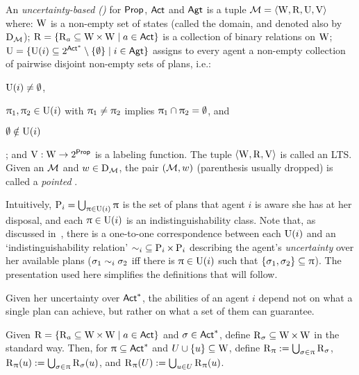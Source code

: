 \medskip

\begin{definition}\label{def:ults}
An \emph{uncertainty-based \lts (\ults)} for ${\rm \sf Prop}$, ${\rm \sf Act}$ and ${\rm \sf Agt}$ is a tuple $\mathcal{M} = \langle \operatorname{W},\operatorname{R},\operatorname{U},\operatorname{V} \rangle$ where: $\operatorname{W}$ is a non-empty set of states (called the domain, and
denoted also by $\operatorname{D}_{\mathcal{M}}$);
$\operatorname{R} = \{ \operatorname{R}_a \subseteq \operatorname{W} \times \operatorname{W} \mid a \in {\rm \sf Act} \}$ is a
collection of binary relations on $\operatorname{W}$;
$\operatorname{U} = \{ \operatorname{U}(i) \subseteq 2^{{\rm \sf Act}^*}\setminus \{ \emptyset \} \mid i \in {\rm \sf Agt} \}$ assigns to every agent a non-empty collection of pairwise disjoint non-empty sets of plans, i.e.: \begin{inlineenum} \item $\operatorname{U}(i) \neq \emptyset$, \item $\uppi_1, \uppi_2 \in \operatorname{U}(i)$ with $\uppi_1 \neq \uppi_2$ implies $\uppi_1 \cap \uppi_2 = \emptyset$, and \item $\emptyset \notin \operatorname{U}(i)$\end{inlineenum};
and $\operatorname{V}:\operatorname{W} \to 2^{\rm \sf Prop}$ is a labeling function. The tuple $\langle \operatorname{W},\operatorname{R},\operatorname{V} \rangle$ is called an LTS. 
Given an \ults $\mathcal{M}$ and $w \in \operatorname{D}_{\mathcal{M}}$, the pair $(\mathcal{M},w)$ (parenthesis usually dropped) is called a \emph{pointed \ults}.
\end{definition}
\medskip


Intuitively, $\operatorname{P}_{i} = \bigcup_{\uppi \in \operatorname{U}(i)} \uppi$ is the set of plans that agent $i$ is aware she has at her disposal, and each $\uppi \in \operatorname{U}(i)$ is an indistinguishability class. Note that, as discussed in~\cite{AFSVQ21}, there is a one-to-one correspondence between each $\operatorname{U}(i)$ and an `indistinguishability relation' ${\sim_i} \subseteq \operatorname{P}_{i} \times \operatorname{P}_{i}$ describing the agent's \emph{uncertainty} over her available plans ($\sigma_1 \sim_i \sigma_2$ iff there is $\uppi \in \operatorname{U}(i)$ such that $\{ \sigma_1, \sigma_2 \} \subseteq \uppi$). The presentation used here simplifies the definitions that will follow.

Given her uncertainty over ${\rm \sf Act}^*$, the abilities of an agent $i$ depend not on what a single plan can achieve, but rather on what a set of them can guarantee.

\medskip

\begin{definition}
Given $\operatorname{R}=\{ \operatorname{R}_a \subseteq \operatorname{W} \times \operatorname{W} \mid a\in{\rm \sf Act} \}$ and $\sigma \in {\rm \sf Act}^*$, define $\operatorname{R}_\sigma \subseteq \operatorname{W} \times \operatorname{W}$ in the standard way. Then, for $\uppi \subseteq {\rm \sf Act}^*$ and $U \cup \{u \} \subseteq \operatorname{W}$, define $\operatorname{R}_\uppi := \bigcup_{\sigma \in \uppi} \operatorname{R}_{\sigma}$, $\operatorname{R}_{\uppi}(u) := \bigcup_{\sigma \in \uppi} \operatorname{R}_\sigma(u)$, and $\operatorname{R}_{\uppi}(U) := \bigcup_{u \in U} \operatorname{R}_{\uppi}(u)$.
\end{definition}

